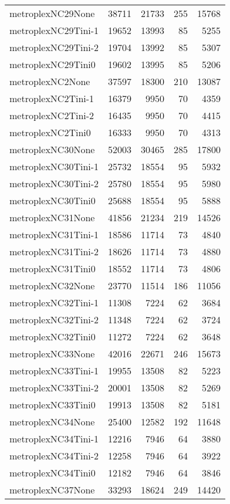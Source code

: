 \begin{longtable}{lrrrr}
metroplexNC29None & 38711 & 21733 & 255 & 15768 \\
metroplexNC29Tini-1 & 19652 & 13993 & 85 & 5255 \\
metroplexNC29Tini-2 & 19704 & 13992 & 85 & 5307 \\
metroplexNC29Tini0 & 19602 & 13995 & 85 & 5206 \\
metroplexNC2None & 37597 & 18300 & 210 & 13087 \\
metroplexNC2Tini-1 & 16379 & 9950 & 70 & 4359 \\
metroplexNC2Tini-2 & 16435 & 9950 & 70 & 4415 \\
metroplexNC2Tini0 & 16333 & 9950 & 70 & 4313 \\
metroplexNC30None & 52003 & 30465 & 285 & 17800 \\
metroplexNC30Tini-1 & 25732 & 18554 & 95 & 5932 \\
metroplexNC30Tini-2 & 25780 & 18554 & 95 & 5980 \\
metroplexNC30Tini0 & 25688 & 18554 & 95 & 5888 \\
metroplexNC31None & 41856 & 21234 & 219 & 14526 \\
metroplexNC31Tini-1 & 18586 & 11714 & 73 & 4840 \\
metroplexNC31Tini-2 & 18626 & 11714 & 73 & 4880 \\
metroplexNC31Tini0 & 18552 & 11714 & 73 & 4806 \\
metroplexNC32None & 23770 & 11514 & 186 & 11056 \\
metroplexNC32Tini-1 & 11308 & 7224 & 62 & 3684 \\
metroplexNC32Tini-2 & 11348 & 7224 & 62 & 3724 \\
metroplexNC32Tini0 & 11272 & 7224 & 62 & 3648 \\
metroplexNC33None & 42016 & 22671 & 246 & 15673 \\
metroplexNC33Tini-1 & 19955 & 13508 & 82 & 5223 \\
metroplexNC33Tini-2 & 20001 & 13508 & 82 & 5269 \\
metroplexNC33Tini0 & 19913 & 13508 & 82 & 5181 \\
metroplexNC34None & 25400 & 12582 & 192 & 11648 \\
metroplexNC34Tini-1 & 12216 & 7946 & 64 & 3880 \\
metroplexNC34Tini-2 & 12258 & 7946 & 64 & 3922 \\
metroplexNC34Tini0 & 12182 & 7946 & 64 & 3846 \\
metroplexNC37None & 33293 & 18624 & 249 & 14420 \\

\end{longtable}
